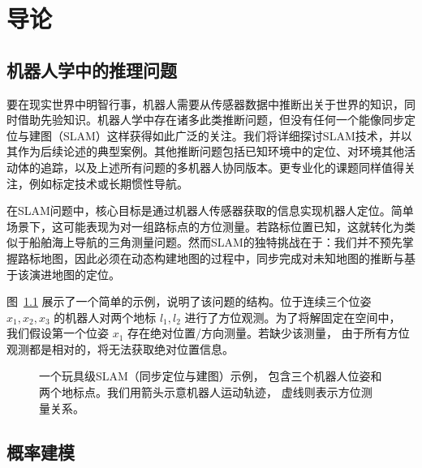 \documentclass[fontset=none]{Notes}
\begin{document}
\frontmatter

\tableofcontents

\mainmatter

\chapter{导论}

\section{机器人学中的推理问题}

要在现实世界中明智行事，机器人需要从传感器数据中推断出关于世界的知识，同时借助先验知识。机器人学中存在诸多此类推断问题，但没有任何一个能像同步定位与建图（SLAM）这样获得如此广泛的关注。我们将详细探讨SLAM技术，并以其作为后续论述的典型案例。其他推断问题包括已知环境中的定位、对环境其他活动体的追踪，以及上述所有问题的多机器人协同版本。更专业化的课题同样值得关注，例如标定技术或长期惯性导航。

在SLAM问题中，核心目标是通过机器人传感器获取的信息实现机器人定位。简单场景下，这可能表现为对一组路标点的方位测量。若路标位置已知，这就转化为类似于船舶海上导航的三角测量问题。然而SLAM的独特挑战在于：我们并不预先掌握路标地图，因此必须在动态构建地图的过程中，同步完成对未知地图的推断与基于该演进地图的定位。

图~\ref{fig:toy slam} 展示了一个简单的示例，说明了该问题的结构。位于连续三个位姿 $x_1,x_2,x_3$ 
的机器人对两个地标 $l_1,l_2$ 进行了方位观测。为了将解固定在空间中，
我们假设第一个位姿 $x_1$ 存在绝对位置/方向测量。若缺少该测量，
由于所有方位观测都是相对的，将无法获取绝对位置信息。

\begin{figure}[htb]
  \centering
  \caption{一个玩具级SLAM（同步定位与建图）示例，
  包含三个机器人位姿和两个地标点。我们用箭头示意机器人运动轨迹，
  虚线则表示方位测量关系。}\label{fig:toy slam}
\end{figure}

\section{概率建模}
\end{document}
